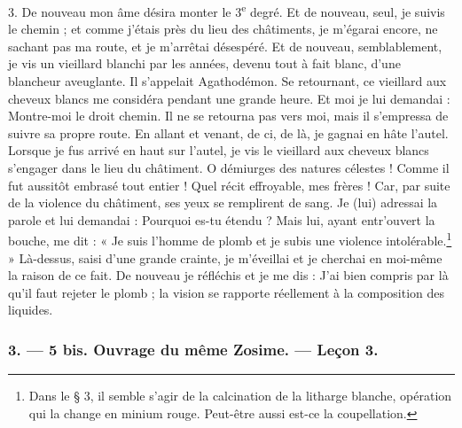 \documentclass[a4paper, 11pt, oneside, polutonikogreek, french]{article}
\begin{document}
3. De nouveau mon âme désira monter le 3\textsuperscript{e} degré. Et de nouveau, seul, je suivis le chemin ; et comme j'étais près du lieu des châtiments, je m'égarai encore, ne sachant pas ma route, et je m'arrêtai désespéré. Et de nouveau, semblablement, je vis un vieillard blanchi par les années, devenu tout à fait blanc, d'une blancheur aveuglante. Il s'appelait Agathodémon. Se retournant, ce vieillard aux cheveux blancs me considéra pendant une grande heure. Et moi je lui demandai : Montre-moi le droit chemin. Il ne se retourna pas vers moi, mais il s'empressa de suivre sa propre route. En allant et venant, de ci, de là, je gagnai en hâte l'autel. Lorsque je fus arrivé en haut sur l'autel, je vis le vieillard aux cheveux blancs s'engager dans le lieu du châtiment. O démiurges des natures célestes ! Comme il fut aussitôt embrasé tout entier ! Quel récit effroyable, mes frères ! Car, par suite de la violence du châtiment, ses yeux se remplirent de sang. Je (lui) adressai la parole et lui demandai : Pourquoi es-tu étendu ? Mais lui, ayant entr'ouvert la bouche, me dit : « Je suis l'homme de plomb et je subis une violence intolérable.\footnote{Dans le § 3, il semble s'agir de la calcination de la litharge blanche, opération qui la change en minium rouge. Peut-être aussi est-ce la coupellation.} » Là-dessus, saisi d'une grande crainte, je m'éveillai et je cherchai en moi-même la raison de ce fait. De nouveau je réfléchis et je me dis : J'ai bien compris par là qu'il faut rejeter le plomb ; la vision se rapporte réellement à la composition des liquides.

\bigskip
\centerline{\EightStarTaper}
\centerline{\EightStarTaper\EightStarTaper}
\bigskip

\subsubsection{3. --- 5 bis. Ouvrage du même Zosime. --- Leçon 3.}
\end{document}
